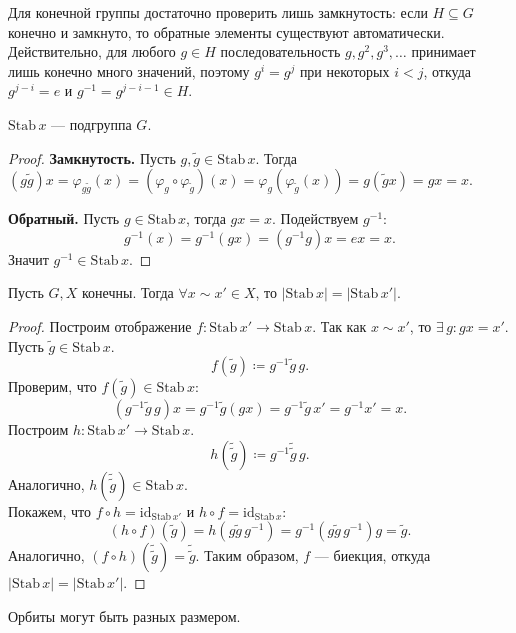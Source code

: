 \begin{remark}
    Для конечной группы достаточно проверить лишь замкнутость: если $H \subseteq G$ конечно и замкнуто,
    то обратные элементы существуют автоматически. Действительно, для любого $g \in H$ последовательность $g, g^2, g^3, \ldots$ принимает
    лишь конечно много значений, поэтому $g^i = g^j$ при некоторых $i < j$, откуда $g^{j-i} = e$ и $g^{-1} = g^{j-i-1} \in H$.
\end{remark}

\begin{stmt}
    $\mathrm{Stab}\, x$ --- подгруппа $G$.
    \begin{proof}
        \textbf{Замкнутость.} Пусть $g, \tilde{g} \in \mathrm{Stab}\, x$. Тогда $(g\tilde{g})x
         = \varphi_{g\tilde{g}}(x) = (\varphi_g \circ \varphi_{\tilde{g}})(x) 
        = \varphi_g(\varphi_{\tilde{g}}(x)) = g(\tilde{g}x) = gx = x$.

        \textbf{Обратный.} Пусть $g \in \mathrm{Stab}\, x$, тогда $gx = x$. Подействуем $g^{-1}$:
        \[
            g^{-1}(x) = g^{-1}(gx) = (g^{-1}g)x = ex = x.
        \]
        Значит $g^{-1} \in \mathrm{Stab}\, x$.
    \end{proof}
\end{stmt}


\begin{stmt}
    Пусть $G, X$ конечны. Тогда $\forall x \sim x' \in X $, то $|\mathrm{Stab}\, x| = |\mathrm{Stab}\, x'|$.
    \begin{proof}
        Построим отображение $f\colon \mathrm{Stab}\, x' \to \mathrm{Stab}\, x$.
        Так как $x \sim x'$, то $\exists\, g\colon gx = x'$.
        Пусть $\tilde{g} \in \mathrm{Stab}\, x$.
        \[
            f(\tilde{g}) \coloneqq g^{-1} \tilde{g}\, g.
        \]
        Проверим, что $f(\tilde{g}) \in \mathrm{Stab}\, x$:
        \[
            (g^{-1}\tilde{g}\, g) x = g^{-1}\tilde{g}(gx) = g^{-1}\tilde{g}\, x' = g^{-1} x' = x.
        \]
        Построим $h\colon \mathrm{Stab}\, x' \to \mathrm{Stab}\, x$.
        \[
            h(\tilde{\tilde{g}}) \coloneqq g^{-1} \tilde{\tilde{g}}\, g.
        \]
        Аналогично, $h(\tilde{\tilde{g}}) \in \mathrm{Stab}\, x$. \\
        Покажем, что $f \circ h = \mathrm{id}_{\mathrm{Stab}\, x'}$ и $h \circ f = \mathrm{id}_{\mathrm{Stab}\, x}$:
        \[
            (h \circ f)(\tilde{g}) = h(g\tilde{g}\, g^{-1}) = g^{-1}(g\tilde{g}\, g^{-1})g = \tilde{g}.
        \]
        Аналогично, $(f \circ h)(\tilde{\tilde{g}}) = \tilde{\tilde{g}}$.
        Таким образом, $f$ — биекция, откуда $|\mathrm{Stab}\, x| = |\mathrm{Stab}\, x'|$.    \end{proof}


    \begin{remark}
        Орбиты могут быть разных размером.
    \end{remark}
\end{stmt}


